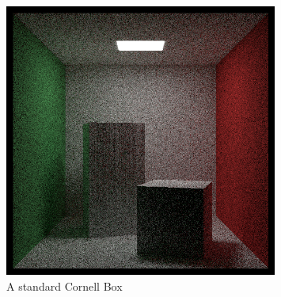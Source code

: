 \documentclass[../main.tex]{subfiles}
\begin{document}
\begin{figure}[h]
    \centering
    \includegraphics[width=0.8\textwidth]{images/CornellBox.png}
    \caption{A standard Cornell Box}
    \label{fig:CornellBox}

\end{figure}
\end{document}
